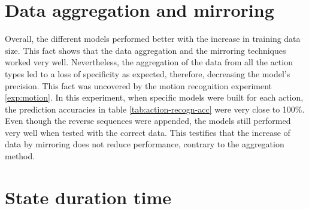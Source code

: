 \section{Data aggregation and mirroring}
Overall, the different models performed better with the increase in training data size. This fact shows that the data aggregation and the mirroring techniques worked very well. Nevertheless, the aggregation of the data from all the action types led to a loss of specificity as expected, therefore, decreasing the model's precision. This fact was uncovered by the motion recognition experiment \ref{exp:motion}. In this experiment, when specific models were built for each action, the prediction accuracies in table \ref{tab:action-recogn-acc} were very close to 100\%.\\
Even though the reverse sequences were appended, the models still performed very well when tested with the correct data. This testifies that the increase of data by mirroring does not reduce performance, contrary to the aggregation method.
\section{State duration time}